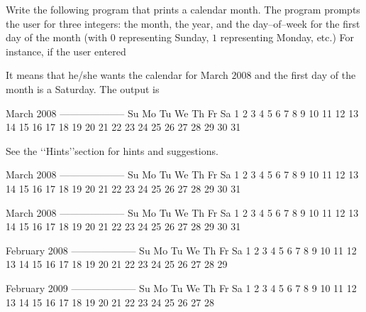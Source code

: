 Write the following program that prints a calendar month.
The program prompts the user for three integers: the month, the year, and the
day--of--week for the first day of the month (with $0$ representing Sunday, $1$
representing Monday, etc.) For instance, if the user entered
\begin{console}[commandchars=\\\{\}]
\end{console}
It means that he/she wants the calendar for March $2008$ and the first day of
the month is a Saturday. The output is
\begin{console}
March 2008
--------------------
Su Mo Tu We Th Fr Sa  
                   1
 2  3  4  5  6  7  8
 9 10 11 12 13 14 15 
16 17 18 19 20 21 22
23 24 25 26 27 28 29
30 31
\end{console}

See the \lq\lq Hints\rq\rq section for hints and suggestions.

\resett
\nextt
\begin{console}[commandchars=\\\{\}]
March 2008
--------------------
Su Mo Tu We Th Fr Sa  
                   1
 2  3  4  5  6  7  8
 9 10 11 12 13 14 15 
16 17 18 19 20 21 22
23 24 25 26 27 28 29
30 31
\end{console}

\nextt
\begin{console}[commandchars=\\\{\}]
March 2008
--------------------
Su Mo Tu We Th Fr Sa  
             1  2  3
 4  5  6  7  8  9 10
11 12 13 14 15 16 17 
18 19 20 21 22 23 24 
25 26 27 28 29 30 31
\end{console}

\nextt
\begin{console}[commandchars=\\\{\}]
February 2008
--------------------
Su Mo Tu We Th Fr Sa  
                1  2
 3  4  5  6  7  8  9
10 11 12 13 14 15 16 
17 18 19 20 21 22 23 
24 25 26 27 28 29
\end{console}

\nextt
\begin{console}[commandchars=\\\{\}]
February 2009
--------------------
Su Mo Tu We Th Fr Sa  
 1  2  3  4  5  6  7  
 8  9 10 11 12 13 14 
15 16 17 18 19 20 21 
22 23 24 25 26 27 28
\end{console}


